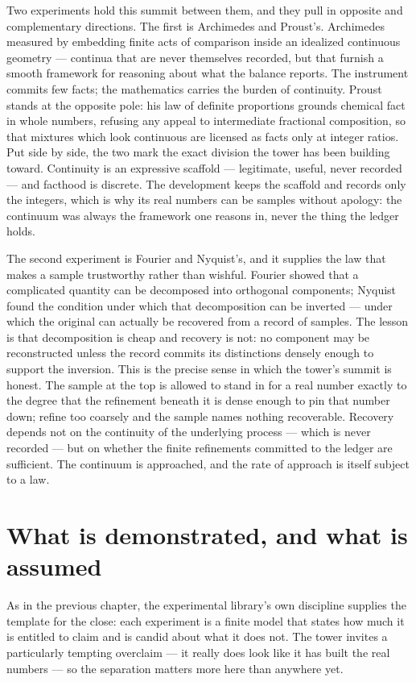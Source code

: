 Two experiments hold this summit between them, and they pull in opposite and complementary directions.
The first is Archimedes and Proust's. Archimedes measured by embedding finite acts of comparison
inside an idealized continuous geometry --- continua that are never themselves recorded, but that
furnish a smooth framework for reasoning about what the balance reports. The instrument commits few
facts; the mathematics carries the burden of continuity. Proust stands at the opposite pole: his law
of definite proportions grounds chemical fact in whole numbers, refusing any appeal to intermediate
fractional composition, so that mixtures which look continuous are licensed as facts only at integer
ratios. Put side by side, the two mark the exact division the tower has been building toward.
Continuity is an expressive scaffold --- legitimate, useful, never recorded --- and facthood is
discrete. The development keeps the scaffold and records only the integers, which is why its real
numbers can be samples without apology: the continuum was always the framework one reasons in, never
the thing the ledger holds.

The second experiment is Fourier and Nyquist's, and it supplies the law that makes a sample
trustworthy rather than wishful. Fourier showed that a complicated quantity can be decomposed into
orthogonal components; Nyquist found the condition under which that decomposition can be inverted ---
under which the original can actually be recovered from a record of samples. The lesson is that
decomposition is cheap and recovery is not: no component may be reconstructed unless the record commits
its distinctions densely enough to support the inversion. This is the precise sense in which the
tower's summit is honest. The sample at the top is allowed to stand in for a real number exactly to
the degree that the refinement beneath it is dense enough to pin that number down; refine too coarsely
and the sample names nothing recoverable. Recovery depends not on the continuity of the underlying
process --- which is never recorded --- but on whether the finite refinements committed to the ledger
are sufficient. The continuum is approached, and the rate of approach is itself subject to a law.

\section{What is demonstrated, and what is assumed}
\label{se:demonstrated-assumed-ch2}

As in the previous chapter, the experimental library's own discipline supplies the template for the
close: each experiment is a finite model that states how much it is entitled to claim and is candid
about what it does not. The tower invites a particularly tempting overclaim --- it really does look
like it has built the real numbers --- so the separation matters more here than anywhere yet.

